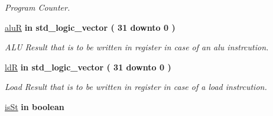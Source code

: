 \begin{DoxyCompactItemize}
\begin{DoxyCompactList}\small\item\em Program Counter. \end{DoxyCompactList}\item 
\hypertarget{class_o_f_unit_a15f3af98c390c64fec95e54717345647}{\hyperlink{class_o_f_unit_a15f3af98c390c64fec95e54717345647}{alu\-R}  {\bfseries {\bfseries \textcolor{vhdlkeyword}{in}\textcolor{vhdlchar}{ }}} {\bfseries \textcolor{comment}{std\-\_\-logic\-\_\-vector}\textcolor{vhdlchar}{ }\textcolor{vhdlchar}{(}\textcolor{vhdlchar}{ } \textcolor{vhdldigit}{31} \textcolor{vhdlchar}{ }\textcolor{vhdlchar}{ }\textcolor{vhdlchar}{ }\textcolor{vhdlkeyword}{downto}\textcolor{vhdlchar}{ }\textcolor{vhdlchar}{ }\textcolor{vhdlchar}{ } \textcolor{vhdldigit}{0} \textcolor{vhdlchar}{ }\textcolor{vhdlchar}{)}\textcolor{vhdlchar}{ }} }\label{class_o_f_unit_a15f3af98c390c64fec95e54717345647}

\begin{DoxyCompactList}\small\item\em A\-L\-U Result that is to be written in register in case of an alu instrcution. \end{DoxyCompactList}\item 
\hypertarget{class_o_f_unit_a853c1b450b6ba2b91af02d5fdb93bc32}{\hyperlink{class_o_f_unit_a853c1b450b6ba2b91af02d5fdb93bc32}{ld\-R}  {\bfseries {\bfseries \textcolor{vhdlkeyword}{in}\textcolor{vhdlchar}{ }}} {\bfseries \textcolor{comment}{std\-\_\-logic\-\_\-vector}\textcolor{vhdlchar}{ }\textcolor{vhdlchar}{(}\textcolor{vhdlchar}{ } \textcolor{vhdldigit}{31} \textcolor{vhdlchar}{ }\textcolor{vhdlchar}{ }\textcolor{vhdlchar}{ }\textcolor{vhdlkeyword}{downto}\textcolor{vhdlchar}{ }\textcolor{vhdlchar}{ }\textcolor{vhdlchar}{ } \textcolor{vhdldigit}{0} \textcolor{vhdlchar}{ }\textcolor{vhdlchar}{)}\textcolor{vhdlchar}{ }} }\label{class_o_f_unit_a853c1b450b6ba2b91af02d5fdb93bc32}

\begin{DoxyCompactList}\small\item\em Load Result that is to be written in register in case of a load instrcution. \end{DoxyCompactList}\item 
\hypertarget{class_o_f_unit_ada232e9bb13e48ba67c49897a8f2a98c}{\hyperlink{class_o_f_unit_ada232e9bb13e48ba67c49897a8f2a98c}{is\-St}  {\bfseries {\bfseries \textcolor{vhdlkeyword}{in}\textcolor{vhdlchar}{ }}} {\bfseries \textcolor{comment}{boolean}\textcolor{vhdlchar}{ }} }\label{class_o_f_unit_ada232e9bb13e48ba67c49897a8f2a98c}


\end{DoxyCompactItemize}
